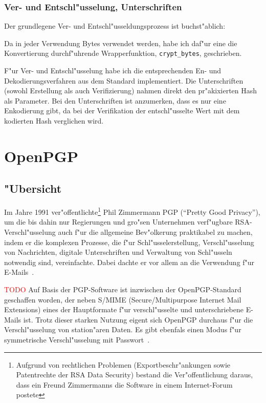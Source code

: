 \documentclass[12pt]{article}
\newcommand{\todo}[1]{\textcolor{red}{\mbox{TODO}}\marginpar{\textcolor{red}{#1}}}
\begin{document}
\subsubsection{Ver- und Entschl"usselung, Unterschriften}
Der grundlegene Ver- und Entschl"usseldungsprozess ist buchst"ablich:

Da in jeder Verwendung Bytes verwendet werden, habe ich daf"ur eine die Konvertierung
durchf"uhrende Wrapperfunktion, \lstinline{crypt_bytes}, geschrieben.

F"ur Ver- und Entschl"usselung habe ich die entsprechenden En- und Dekodierungsverfahren
aus dem Standard implementiert.
Die Unterschriften (sowohl Erstellung als auch Verifizierung) nahmen direkt den
pr"akixierten Hash als Parameter.
Bei den Unterschriften ist anzumerken, dass es nur eine Enkodierung gibt,
da bei der Verifikation der entschl"usselte Wert mit dem kodierten Hash verglichen wird.

\section{OpenPGP}
\subsection{"Ubersicht}

Im Jahre 1991 ver"offentlichte\footnote{Aufgrund von rechtlichen Problemen
(Exportbeschr"ankungen sowie Patentrechte der RSA Data Security) bestand die Ver"offentlichung daraus,
dass ein Freund Zimmermanns die Software in einem Internet-Forum postete}
Phil Zimmermann PGP ("`Pretty Good Privacy"'),
um die bis dahin nur Regierungen und gro"sen Unternehmen verf"ugbare RSA-Verschl"usselung
auch f"ur die allgemeine Bev"olkerung praktikabel zu machen,
indem er die komplexen Prozesse, die f"ur Schl"usselerstellung,
Verschl"usselung von Nachrichten, digitale Unterschriften und Verwaltung von Schl"usseln
notwendig sind, vereinfachte.
Dabei dachte er vor allem an die Verwendung f"ur E-Mails~\cite{singh}.

\todo{Zu viele "Uberschneidungen mit der Einleitung?}
Auf Basis der PGP-Software ist inzwischen der OpenPGP-Standard geschaffen worden,
der neben S/MIME (Secure/Multipurpose Internet Mail Extensions)
eines der Hauptformate f"ur verschl"usselte und unterschriebene E-Mails ist.
Trotz dieser starken Nutzung eigent sich OpenPGP durchaus f"ur die Verschl"usselung
von station"aren Daten.
Es gibt ebenfals einen Modus f"ur symmetrische Verschl"usselung mit Passwort~\cite{rfc4480}.
\end{document}
